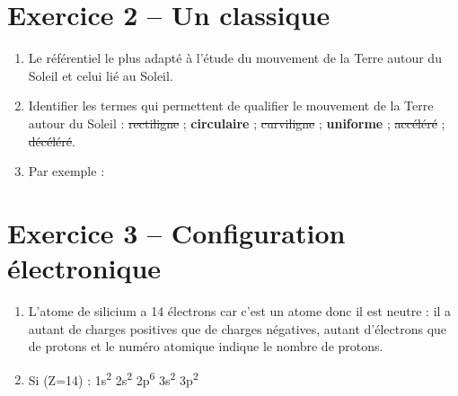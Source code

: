 \documentclass[12pt,a4paper, fleqn]{article}
\begin{document}
\section*{Exercice 2 -- Un classique}

\begin{multicols}{2}
\begin{enumerate}
\item Le référentiel le plus adapté à l'étude du mouvement de la Terre autour du Soleil et celui lié au Soleil.

\item \textcolor{gray_f}{Identifier les termes qui permettent de qualifier le mouvement de la Terre autour du Soleil :}
\sout{rectiligne} ; \textbf{circulaire} ; \sout{curviligne} ; \textbf{uniforme} ; \sout{accéléré} ; \sout{décéléré}.
\end{enumerate}

\begin{center}
\end{center}
\end{multicols}

\begin{enumerate}
\setcounter{enumi}{2}
\item Par exemple :
\begin{center}
\end{center}
\end{enumerate}

\section*{Exercice 3 -- Configuration électronique}

\begin{enumerate}
\item L'atome de silicium a 14 électrons car c'est un atome donc il est neutre : il a autant de charges positives que de charges négatives, \cad{} autant d'électrons que de protons et le numéro atomique indique le nombre de protons.

\item Si (Z=14) : 1s\textsuperscript{2} 2s\textsuperscript{2} 2p\textsuperscript{6} 3s\textsuperscript{2} 3p\textsuperscript{2}

\end{enumerate}
\end{document}
